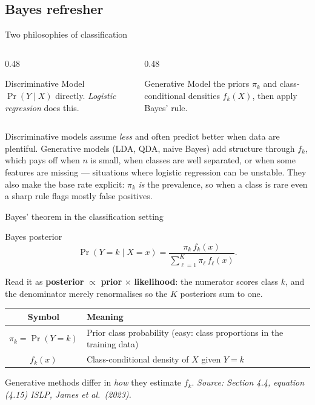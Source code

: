 \documentclass[aspectratio=169,11pt]{beamer}
\newcommand{\islpsource}[1]{%
  \vfill\hfill{\tiny\itshape\color{gray}Source: #1 \textemdash{} ISLP, James et al.\ (2023).}\par
}
\begin{document}
\subsection{Bayes refresher}

\begin{frame}{Two philosophies of classification}
  \begin{columns}[T]
    \begin{column}{0.48\textwidth}
      \begin{block}{Discriminative}
        Model $\Pr(Y \mid X)$ directly. \emph{Logistic regression}
        does this.
      \end{block}
    \end{column}
    \begin{column}{0.48\textwidth}
      \begin{block}{Generative}
        Model the priors $\pi_k$ and class-conditional densities
        $f_k(X)$, then apply Bayes' rule.
      \end{block}
    \end{column}
  \end{columns}
  \begin{takeaway}
    Discriminative models assume \emph{less} and often predict better
    when data are plentiful. Generative models (LDA, QDA, naive Bayes)
    add structure through $f_k$, which pays off when $n$ is small, when
    classes are well separated, or when some features are missing ---
    situations where logistic regression can be unstable. They also make the
    base rate explicit: $\pi_k$ \emph{is} the prevalence, so when a class is
    rare even a sharp rule flags mostly false positives.
  \end{takeaway}
\end{frame}

\begin{frame}{Bayes' theorem in the classification setting}
  \begin{block}{Bayes posterior}
    \[
      \boxed{\;
        \Pr(Y = k \mid X = x)
          = \frac{\pi_k\, f_k(x)}{\sum_{\ell=1}^K \pi_\ell\, f_\ell(x)}.
      \;}
    \]
  \end{block}
  Read it as \textbf{posterior} $\propto$ \textbf{prior} $\times$
  \textbf{likelihood}: the numerator scores class $k$, and the
  denominator merely renormalises so the $K$ posteriors sum to one.
  \begin{readme}
    \begin{tabular}{@{}cl@{}}
      \toprule
      \textbf{Symbol} & \textbf{Meaning} \\
      \midrule
      $\pi_k = \Pr(Y = k)$ & Prior class probability (easy: class
                              proportions in the training data) \\
      $f_k(x)$ & Class-conditional density of $X$ given $Y = k$ \\
      \bottomrule
    \end{tabular}
  \end{readme}
  Generative methods differ in \emph{how} they estimate $f_k$.
  \islpsource{Section 4.4, equation (4.15)}
\end{frame}
\end{document}
